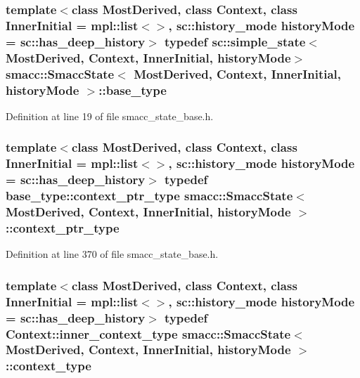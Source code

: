 \subsubsection[{\texorpdfstring{base\+\_\+type}{base_type}}]{\setlength{\rightskip}{0pt plus 5cm}template$<$class Most\+Derived, class Context, class Inner\+Initial = mpl\+::list$<$$>$, sc\+::history\+\_\+mode history\+Mode = sc\+::has\+\_\+deep\+\_\+history$>$ typedef sc\+::simple\+\_\+state$<$Most\+Derived, Context, Inner\+Initial, history\+Mode$>$ {\bf smacc\+::\+Smacc\+State}$<$ Most\+Derived, Context, Inner\+Initial, history\+Mode $>$\+::{\bf base\+\_\+type}\hspace{0.3cm}{\ttfamily [private]}}\hypertarget{classsmacc_1_1SmaccState_a68f547c6fe147554bbe607b6fcd8e40a}{}\label{classsmacc_1_1SmaccState_a68f547c6fe147554bbe607b6fcd8e40a}


Definition at line 19 of file smacc\+\_\+state\+\_\+base.\+h.

\subsubsection[{\texorpdfstring{context\+\_\+ptr\+\_\+type}{context_ptr_type}}]{\setlength{\rightskip}{0pt plus 5cm}template$<$class Most\+Derived, class Context, class Inner\+Initial = mpl\+::list$<$$>$, sc\+::history\+\_\+mode history\+Mode = sc\+::has\+\_\+deep\+\_\+history$>$ typedef base\+\_\+type\+::context\+\_\+ptr\+\_\+type {\bf smacc\+::\+Smacc\+State}$<$ Most\+Derived, Context, Inner\+Initial, history\+Mode $>$\+::{\bf context\+\_\+ptr\+\_\+type}}\hypertarget{classsmacc_1_1SmaccState_a0e15b77514301039f6bc093a9d3f6425}{}\label{classsmacc_1_1SmaccState_a0e15b77514301039f6bc093a9d3f6425}


Definition at line 370 of file smacc\+\_\+state\+\_\+base.\+h.

\subsubsection[{\texorpdfstring{context\+\_\+type}{context_type}}]{\setlength{\rightskip}{0pt plus 5cm}template$<$class Most\+Derived, class Context, class Inner\+Initial = mpl\+::list$<$$>$, sc\+::history\+\_\+mode history\+Mode = sc\+::has\+\_\+deep\+\_\+history$>$ typedef Context\+::inner\+\_\+context\+\_\+type {\bf smacc\+::\+Smacc\+State}$<$ Most\+Derived, Context, Inner\+Initial, history\+Mode $>$\+::{\bf context\+\_\+type}}\hypertarget{classsmacc_1_1SmaccState_a65c128d05dbcadbf817f41ba20b8fa01}{}\label{classsmacc_1_1SmaccState_a65c128d05dbcadbf817f41ba20b8fa01}


